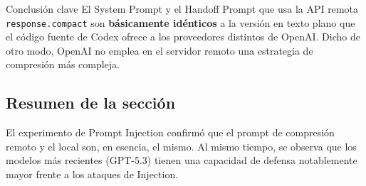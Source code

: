 \begin{importantbox}{Conclusión clave}
El System Prompt y el Handoff Prompt que usa la API remota \texttt{response.compact} son \textbf{básicamente idénticos} a la versión en texto plano que el código fuente de Codex ofrece a los proveedores distintos de OpenAI. Dicho de otro modo, OpenAI no emplea en el servidor remoto una estrategia de compresión más compleja.
\end{importantbox}

\subsection{Resumen de la sección}

El experimento de Prompt Injection confirmó que el prompt de compresión remoto y el local son, en esencia, el mismo. Al mismo tiempo, se observa que los modelos más recientes (GPT-5.3) tienen una capacidad de defensa notablemente mayor frente a los ataques de Injection.
